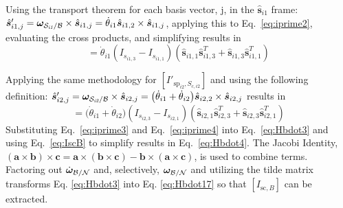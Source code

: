 \documentclass[paper]{aiaaNew}
\begin{document}
	Using the transport theorem for each basis vector, j, in the $\bm{\hat{s}}_{i1}$ frame: $\hat{\bm s}'_{i1,j} = \bm\omega_{\cal{S}_{\textit{i1}}/\cal{B}}\times\hat{\bm s}_{i1,j}=\dot{\theta}_{i1}\hat{\bm s}_{i1,2}\times\hat{\bm s}_{i1,j}$, applying this to Eq.~\eqref{eq:iprime2}, evaluating the cross products, and simplifying results in
	\begin{equation}
	[I'_{\text{sp}_{i1},S_{c,i1}}] = \dot{\theta}_{i1}(I_{s_{i1,3}}-I_{s_{i1,1}})(\hat{\bm s}_{i1,1}\hat{\bm s}_{i1,3}^{T}+\hat{\bm s}_{i1,3}\hat{\bm s}_{i1,1}^{T})
	\label{eq:iprime3}
	\end{equation}
	
	Applying the same methodology for $[I'_{\text{sp}_{i2},S_{c,i2}}]$ and using the following definition: $\hat{\bm s}'_{i2,j} = \bm\omega_{\cal{S}_{\textit{i2}}/\cal{B}}\times\hat{\bm s}_{i2,j}=\big(\dot{\theta}_{i1} + \dot{\theta}_{i2} \big)\hat{\bm s}_{i2,2}\times\hat{\bm s}_{i2,j}$ results in 
	\begin{equation}
	[I'_{\text{sp}_{i2},S_{c,i2}}] = \big(\dot{\theta}_{i1}+\dot{\theta}_{i2}\big)(I_{s_{i2,3}}-I_{s_{i2,1}})(\hat{\bm s}_{i2,1}\hat{\bm s}_{i2,3}^{T}+\hat{\bm s}_{i2,3}\hat{\bm s}_{i2,1}^{T})
	\label{eq:iprime4}
	\end{equation}
	Substituting Eq.~\eqref{eq:iprime3} and Eq.~\eqref{eq:iprime4} into Eq.~\eqref{eq:Hbdot3} and using Eq.~\eqref{eq:IscB} to simplify results in Eq.~\eqref{eq:Hbdot4}. The Jacobi Identity, $(\bm a \times \bm b)\times \bm c = \bm a \times (\bm b\times \bm c) - \bm b \times (\bm a\times \bm c)$, is used to combine terms.\\
	Factoring out $\dot{\bm\omega}_{\cal B/N}$ and, selectively, $\bm{\omega}_{\cal B/N}$ and utilizing the tilde matrix transforms Eq. \ref{eq:Hbdot3} into Eq. \ref{eq:Hbdot17} so that $[I_{\text{sc},B}]$ can be extracted.
\end{document}
